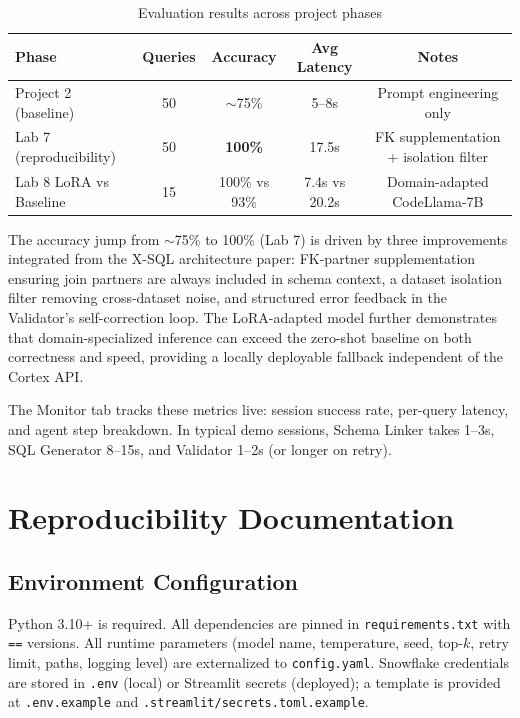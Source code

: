 \documentclass[11pt,letterpaper]{article}
\begin{document}
\begin{table}[H]
\centering\small
\begin{tabular}{@{}lcccc@{}}
\toprule
\textbf{Phase} & \textbf{Queries} & \textbf{Accuracy} & \textbf{Avg Latency} & \textbf{Notes} \\
\midrule
Project 2 (baseline) & 50 & $\sim$75\% & 5--8s & Prompt engineering only \\
Lab 7 (reproducibility) & 50 & \textbf{100\%} & 17.5s & FK supplementation + isolation filter \\
Lab 8 LoRA vs Baseline & 15 & 100\% vs 93\% & 7.4s vs 20.2s & Domain-adapted CodeLlama-7B \\
\bottomrule
\end{tabular}
\caption{Evaluation results across project phases}
\end{table}

The accuracy jump from $\sim$75\% to 100\% (Lab 7) is driven by three improvements integrated from the X-SQL architecture paper: FK-partner supplementation ensuring join partners are always included in schema context, a dataset isolation filter removing cross-dataset noise, and structured error feedback in the Validator's self-correction loop. The LoRA-adapted model further demonstrates that domain-specialized inference can exceed the zero-shot baseline on both correctness and speed, providing a locally deployable fallback independent of the Cortex API.

The Monitor tab tracks these metrics live: session success rate, per-query latency, and agent step breakdown. In typical demo sessions, Schema Linker takes 1--3s, SQL Generator 8--15s, and Validator 1--2s (or longer on retry).

\section{Reproducibility Documentation}

\subsection{Environment Configuration}

Python 3.10+ is required. All dependencies are pinned in \texttt{requirements.txt} with \texttt{==} versions. All runtime parameters (model name, temperature, seed, top-$k$, retry limit, paths, logging level) are externalized to \texttt{config.yaml}. Snowflake credentials are stored in \texttt{.env} (local) or Streamlit secrets (deployed); a template is provided at \texttt{.env.example} and \texttt{.streamlit/secrets.toml.example}.
\end{document}
